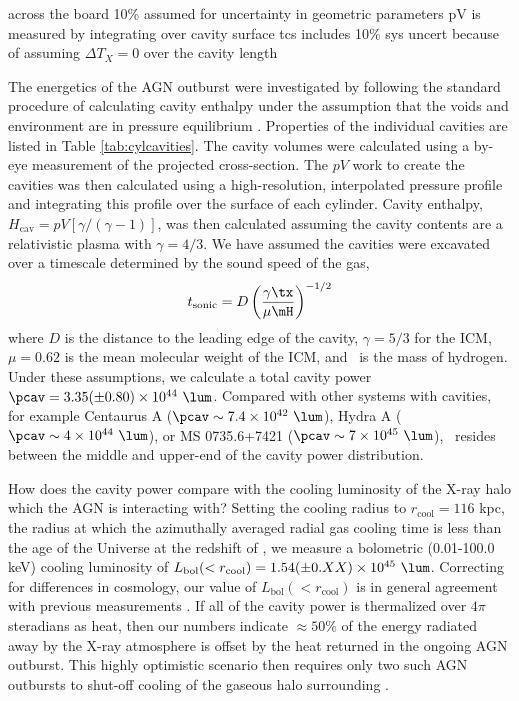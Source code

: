 \documentclass{emulateapj}
\begin{document}
across the board 10\% assumed for uncertainty in geometric parameters
pV is measured by integrating over cavity surface
tcs includes 10\% sys uncert because of assuming $\Delta T_X = 0$ over the cavity length

The energetics of the AGN outburst were investigated by following the
standard procedure of calculating cavity enthalpy under the assumption
that the voids and environment are in pressure equilibrium
\citep[][for a review]{rafferty06, mcnamrev}. Properties of the
individual cavities are listed in Table \ref{tab:cylcavities}. The
cavity volumes were calculated using a by-eye measurement of the
projected cross-section. The $pV$ work to create the cavities was then
calculated using a high-resolution, interpolated pressure profile and
integrating this profile over the surface of each cylinder. Cavity
enthalpy, $H_{\mathrm{cav}} = pV[\gamma/(\gamma-1)]$, was then calculated
assuming the cavity contents are a relativistic plasma with $\gamma =
4/3$. We have assumed the cavities were excavated over a timescale
determined by the sound speed of the gas,
\begin{equation}
  t_{\mathrm{sonic}} = D \left(\frac{\gamma \tx}{\mu \mH}\right)^{-1/2} \nonumber
\end{equation}
where $D$ is the distance to the leading edge of the cavity,
$\gamma=5/3$ for the ICM, $\mu=0.62$ is the mean molecular weight of
the ICM, and \mH\ is the mass of hydrogen. Under these assumptions, we
calculate a total cavity power $\pcav = 3.35(\pm0.80)\times10^{44}
~\lum$. Compared with other systems with cavities, for example
Centaurus A ($\pcav \sim 7.4\times10^{42} ~\lum$), Hydra A ($\pcav
\sim 4\times10^{44} ~\lum$), or MS 0735.6+7421 ($\pcav \sim
7\times10^{45} ~\lum$), \iras\ resides between the middle and
upper-end of the cavity power distribution.

How does the cavity power compare with the cooling luminosity of the
X-ray halo which the AGN is interacting with? Setting the cooling
radius to $r_{\mathrm{cool}} = 116$ kpc, the radius at which the
azimuthally averaged radial gas cooling time is less than the age of
the Universe at the redshift of \iras, we measure a bolometric
(0.01-100.0 keV) cooling luminosity of $L_{\mathrm{bol}}(<
r_{\mathrm{cool}}) = 1.54(\pm 0.XX)\times10^{45} ~\lum$. Correcting
for differences in cosmology, our value of $L_{\mathrm{bol}}(<
r_{\mathrm{cool}})$ is in general agreement with previous measurements
\citep{1994ApJ...436L..51F, 1995MNRAS.274L..63F,
1998MNRAS.297L..57A}. If all of the cavity power is thermalized over
$4\pi$ steradians as heat, then our numbers indicate $\approx 50\%$ of
the energy radiated away by the X-ray atmosphere is offset by the heat
returned in the ongoing AGN outburst. This highly optimistic scenario
then requires only two such AGN outbursts to shut-off cooling of the
gaseous halo surrounding
\iras.
\end{document}
